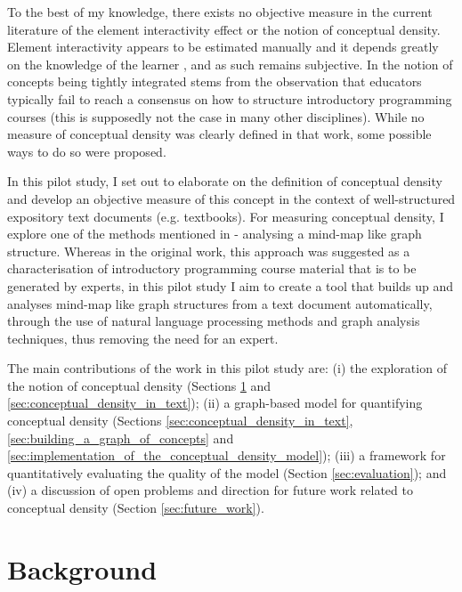 \documentclass[12pt]{article}
\theoremstyle{grammarstyle}
\begin{document}
To the best of my knowledge, there exists no objective measure in the current literature of the element interactivity effect or the notion of conceptual density. Element interactivity appears to be estimated manually and it depends greatly on the knowledge of the learner \citep{chandler1996cognitive}, and as such remains subjective. In \citep{robins2010learning} the notion of concepts being tightly integrated stems from the observation that educators typically fail to reach a consensus on how to structure introductory programming courses (this is supposedly not the case in many other disciplines). While no measure of conceptual density was clearly defined in that work, some possible ways to do so were proposed.

In this pilot study, I set out to elaborate on the definition of conceptual density and develop an objective measure of this concept in the context of well-structured expository text documents (e.g. textbooks). For measuring conceptual density, I explore one of the methods mentioned in \citep{robins2010learning} - analysing a mind-map like graph structure. Whereas in the original work, this approach was suggested as a characterisation of introductory programming course material that is to be generated by experts, in this pilot study I aim to create a tool that builds up and analyses mind-map like graph structures from a text document automatically, through the use of natural language processing methods and graph analysis techniques, thus removing the need for an expert.

The main contributions of the work in this pilot study are:
(i) the exploration of the notion of conceptual density (Sections \ref{sec:background} and \ref{sec:conceptual_density_in_text});
(ii) a graph-based model for quantifying conceptual density (Sections \ref{sec:conceptual_density_in_text}, \ref{sec:building_a_graph_of_concepts} and \ref{sec:implementation_of_the_conceptual_density_model});
(iii) a framework for quantitatively evaluating the quality of the model (Section \ref{sec:evaluation});
and (iv) a discussion of open problems and direction for future work related to conceptual density (Section \ref{sec:future_work}).

\section{Background} \label{sec:background}
\end{document}
